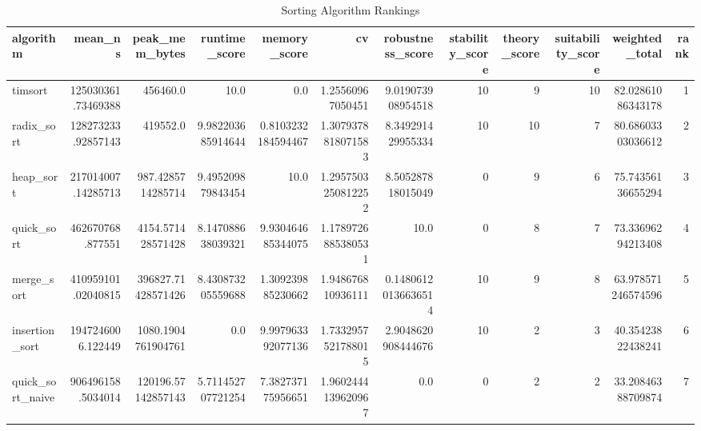 \begin{table}[htbp]
\centering
\caption{Sorting Algorithm Rankings}
\label{tab:scores_sorting}
\begin{tabular}{lrrrrrrrrrrr}
\hline
algorithm & mean_ns & peak_mem_bytes & runtime_score & memory_score & cv & robustness_score & stability_score & theory_score & suitability_score & weighted_total & rank \\
\hline
timsort & 125030361.73469388 & 456460.0 & 10.0 & 0.0 & 1.25560967050451 & 9.019073908954518 & 10 & 9 & 10 & 82.02861086343178 & 1 \\
radix_sort & 128273233.92857143 & 419552.0 & 9.982203685914644 & 0.8103232184594467 & 1.3079378818071583 & 8.349291429955334 & 10 & 10 & 7 & 80.68603303036612 & 2 \\
heap_sort & 217014007.14285713 & 987.4285714285714 & 9.495209879843454 & 10.0 & 1.2957503250812252 & 8.505287818015049 & 0 & 9 & 6 & 75.74356136655294 & 3 \\
quick_sort & 462670768.877551 & 4154.571428571428 & 8.147088638039321 & 9.930464685344075 & 1.1789726885380531 & 10.0 & 0 & 8 & 7 & 73.33696294213408 & 4 \\
merge_sort & 410959101.02040815 & 396827.71428571426 & 8.430873205559688 & 1.309239885230662 & 1.948676810936111 & 0.14806120136636514 & 10 & 9 & 8 & 63.978571246574596 & 5 \\
insertion_sort & 1947246006.122449 & 1080.1904761904761 & 0.0 & 9.997963392077136 & 1.7332957521788015 & 2.9048620908444676 & 10 & 2 & 3 & 40.35423822438241 & 6 \\
quick_sort_naive & 906496158.5034014 & 120196.57142857143 & 5.711452707721254 & 7.382737175956651 & 1.9602444139620967 & 0.0 & 0 & 2 & 2 & 33.20846388709874 & 7 \\
\hline
\end{tabular}
\end{table}
